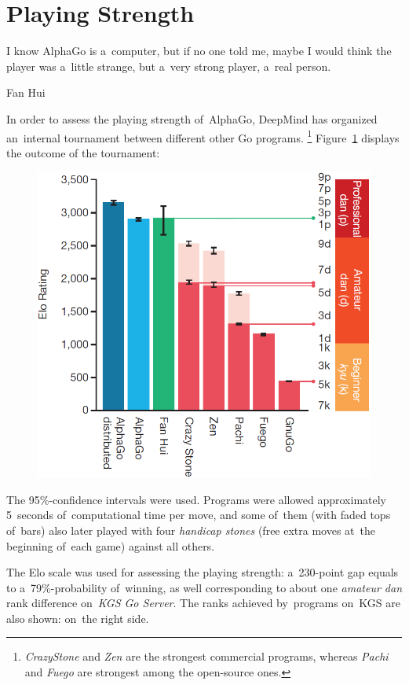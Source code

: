 
\section{Playing Strength}
\epigraph{
  I know AlphaGo is a~computer, but if no one told me, maybe I would think the player was a~little strange, but a~very strong player, a~real person.
}{Fan Hui}
In order to assess the playing strength of~AlphaGo, DeepMind has organized an~internal tournament between different other Go programs.%
\footnote{\emph{CrazyStone} and \emph{Zen} are the strongest commercial programs, whereas \emph{Pachi} and \emph{Fuego} are strongest among the open-source ones.}
Figure~\ref{fig:Go-tournament} displays the outcome of the tournament:
\begin{figure}[H]
  \centering
  \includegraphics[width=.45\textwidth]{../img/results_of_tournament.png}
  \label{fig:Go-tournament}
\end{figure}
The 95\%-confidence intervals were used.
Programs were allowed approximately 5~seconds of~computational time per move, and some of~them (with faded tops of~bars) also later played with four \emph{handicap stones} (free extra moves at~the beginning of~each game) against all others.

The Elo scale was used for assessing the playing strength:
a~230-point gap equals to a~79\%-probability of~winning, as well corresponding to about one \emph{amateur dan} rank difference on~\emph{KGS Go Server}\footnotemark.
The ranks achieved by~programs on~KGS are also shown: on~the right side.

